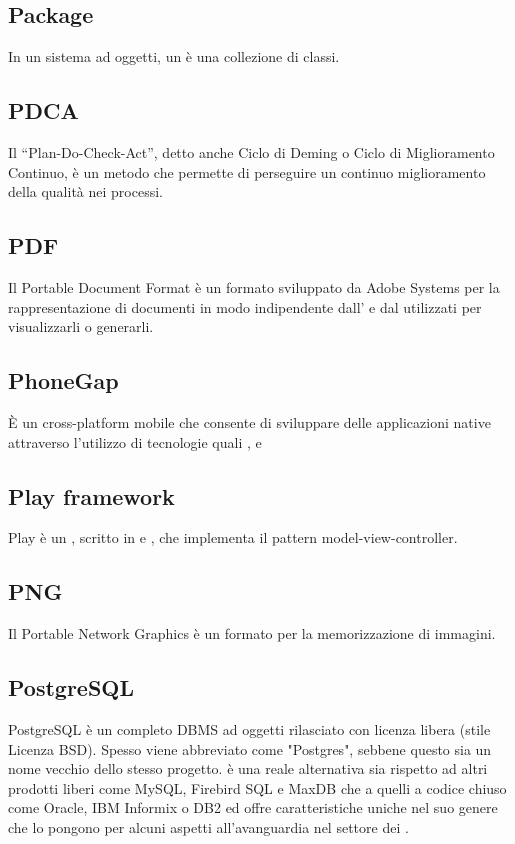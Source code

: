 \subsection{Package}
In un sistema ad oggetti, un  è una collezione di classi.

\subsection{PDCA}
Il “Plan-Do-Check-Act”, detto anche Ciclo di Deming o Ciclo di Miglioramento Continuo,
è un metodo che permette di perseguire un continuo miglioramento della qualità nei processi.

\subsection{PDF}
Il Portable Document Format è un formato sviluppato da Adobe Systems per la rappresentazione di documenti in modo indipendente dall' e dal  utilizzati per
visualizzarli o generarli.

\subsection{PhoneGap}
È un  cross-platform mobile che consente di sviluppare delle applicazioni native attraverso l'utilizzo di tecnologie  quali ,  e 

\subsection{Play framework}
Play è un  , scritto in  e , che implementa il pattern model-view-controller.

\subsection{PNG}
Il Portable Network Graphics è un formato per la memorizzazione di immagini.

\subsection{PostgreSQL}
PostgreSQL è un completo DBMS ad oggetti rilasciato con licenza libera (stile Licenza BSD). Spesso viene abbreviato come "Postgres", sebbene questo sia un nome vecchio dello stesso progetto.  è una reale alternativa sia rispetto ad altri prodotti liberi come MySQL, Firebird SQL e MaxDB che a quelli a codice chiuso come Oracle, IBM Informix o DB2 ed offre caratteristiche uniche nel suo genere che lo pongono per alcuni aspetti all'avanguardia nel settore dei .

